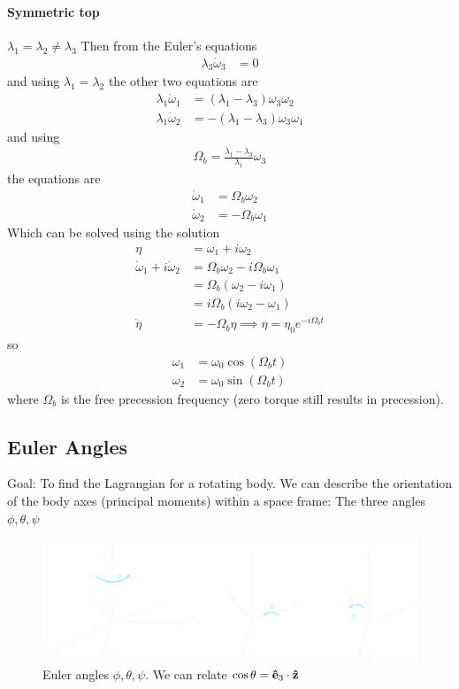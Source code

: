 \documentclass[../main.tex]{subfiles}
\begin{document}
\paragraph*{Symmetric top} $\lambda_1 = \lambda_2 \neq \lambda_3$
Then from the Euler's equations
\begin{align*}
    \lambda_3 \dot \omega_3 &= 0
\end{align*}
and using $\lambda_1 = \lambda_2$ the other two equations are
\begin{align*}
    \lambda_1 \dot \omega_1 &= (\lambda_1 - \lambda_3) \omega_3 \omega_2 \\
    \lambda_1 \dot \omega_2 &= -(\lambda_1 - \lambda_3) \omega_3 \omega_1
\end{align*}
and using
\begin{align*}
    \Omega_b = \frac{\lambda_1 - \lambda_3}{\lambda_1} \omega_3
\end{align*}
the equations are
\begin{align*}
    \dot \omega_1 &= \Omega_b \omega_2 \\
    \dot \omega_2 &= -\Omega_b \omega_1
\end{align*}
Which can be solved using the solution 
\begin{align*}
    \eta &= \omega_1 + i \omega_2 \\
    \dot \omega_1 + i \dot \omega_2 &= \Omega_b \omega_2 - i \Omega_b \omega_1 \\
    &= \Omega_b (\omega_2 -i\omega_1) \\
    &= i\Omega_b (i\omega_2 - \omega_1) \\
    \dot \eta &= - \Omega_b \eta \implies \eta = \eta_0 e^{-i\Omega_b t}
\end{align*}
so
\begin{align*}
    \omega_1 &= \omega_0 \cos(\Omega_b t) \\
    \omega_2 &= \omega_0 \sin(\Omega_b t)
\end{align*}
where $\Omega_b$ is the free precession frequency (zero torque still results in precession). 

\newpage
\subsection*{Euler Angles} Goal: To find the Lagrangian for a rotating body.
We can describe the orientation of the body axes (principal moments) within a space frame:
The three angles $\phi, \theta, \psi$ 

\begin{figure}[ht]
    \centering
    \includegraphics[width=0.8\linewidth]{eulerangle.png}
    \caption{Euler angles $\phi, \theta, \psi$. We can relate $\cos\theta = \vu e_3 \cdot \vu z$}
\end{figure}
\end{document}
